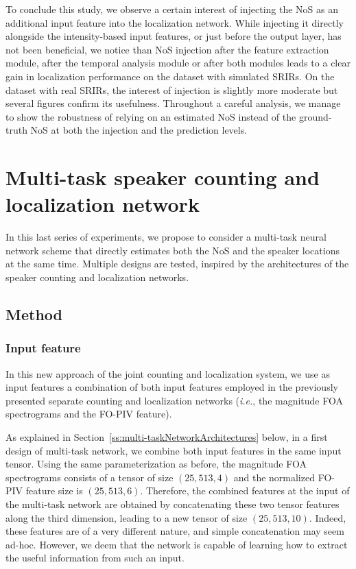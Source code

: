 To conclude this study, we observe a certain interest of injecting the NoS as an additional input feature into the localization network. While injecting it directly alongside the intensity-based input features, or just before the output layer, has not been beneficial, we notice than NoS injection after the feature extraction module, after the temporal analysis module or after both modules leads to a clear gain in localization performance on the dataset with simulated SRIRs. On the dataset with real SRIRs, the interest of injection is slightly more moderate but several figures confirm its usefulness. Throughout a careful analysis, we manage to show the robustness of relying on an estimated NoS instead of the ground-truth NoS at both the injection and the prediction levels.

\clearpage
\section{Multi-task speaker counting and localization network}
\label{sec:Multi-task-counting-loc}

In this last series of experiments, we propose to consider a multi-task neural network scheme that directly estimates both the NoS and the speaker locations at the same time. Multiple designs are tested, inspired by the architectures of the speaker counting and localization networks.

\subsection{Method}

\subsubsection{Input feature}
\label{ss:multi-taskInputFeature}

In this new approach of the joint counting and localization system, we use as input features a combination of both input features employed in the previously presented separate counting and localization networks (\emph{i.e.}, the magnitude FOA spectrograms and the FO-PIV feature).

As explained in Section~\ref{ss:multi-taskNetworkArchitectures} below, in a first design of multi-task network, we combine both input features in the same input tensor. Using the same parameterization as before, the magnitude FOA spectrograms consists of a tensor of size $(25, 513, 4)$ and the normalized FO-PIV feature size is $(25, 513, 6)$. Therefore, the combined features at the input of the multi-task network are obtained by concatenating these two tensor features along the third dimension, leading to a new tensor of size $(25,513,10)$. Indeed, these features are of a very different nature, and simple concatenation may seem ad-hoc. However, we deem that the network is capable of learning how to extract the useful information from such an input.

